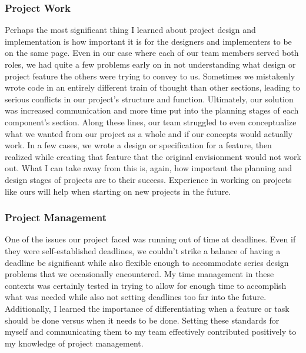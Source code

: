 \documentclass[letterpaper,10pt,titlepage,draftclsnofoot,onecolumn,onesided] {IEEEtran}
\begin{document}
\subsubsection{Project Work}
Perhaps the most significant thing I learned about project design and implementation is how important it is for the designers and implementers to be on the same page.
Even in our case where each of our team members served both roles, we had quite a few problems early on in not understanding what design or project feature the others were trying to convey to us.
Sometimes we mistakenly wrote code in an entirely different train of thought than other sections, leading to serious conflicts in our project's structure and function.
Ultimately, our solution was increased communication and more time put into the planning stages of each component's section.
Along these lines, our team struggled to even conceptualize what we wanted from our project as a whole and if our concepts would actually work.
In a few cases, we wrote a design or specification for a feature, then realized while creating that feature that the original envisionment would not work out.
What I can take away from this is, again, how important the planning and design stages of projects are to their success.
Experience in working on projects like ours will help when starting on new projects in the future. \\

\subsubsection{Project Management}
One of the issues our project faced was running out of time at deadlines. 
Even if they were self-established deadlines, we couldn't strike a balance of having a deadline be significant while also flexible enough to accommodate series design problems that we occasionally encountered.
My time management in these contexts was certainly tested in trying to allow for enough time to accomplish what was needed while also not setting deadlines too far into the future.
Additionally, I learned the importance of differentiating when a feature or task should be done versus when it needs to be done. 
Setting these standards for myself and communicating them to my team effectively contributed positively to my knowledge of project management. \\
\end{document}
